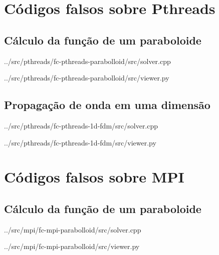 \chapter{Códigos falsos sobre Pthreads}
\section{Cálculo da função de um paraboloide}
     
     {../src/pthreads/fc-pthreads-parabolloid/src/solver.cpp}
     
     
     {../src/pthreads/fc-pthreads-parabolloid/src/viewer.py}

\section{Propagação de onda em uma dimensão}
     
     {../src/pthreads/fc-pthreads-1d-fdm/src/solver.cpp}
     
     
     {../src/pthreads/fc-pthreads-1d-fdm/src/viewer.py}

\chapter{Códigos falsos sobre MPI}
\section{Cálculo da função de um paraboloide}
     
     {../src/mpi/fc-mpi-parabolloid/src/solver.cpp}
     
     
     {../src/mpi/fc-mpi-parabolloid/src/viewer.py}

